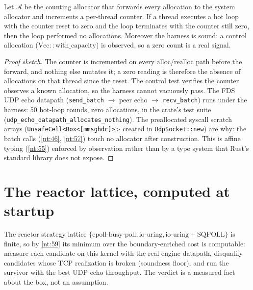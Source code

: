 \begin{theorem}\label{nt:68}
Let $\mathcal{A}$ be the counting allocator that forwards every
allocation to the system allocator and increments a per-thread counter.
If a thread executes a hot loop with the counter reset to zero and the
loop terminates with the counter still zero, then the loop performed no
allocations. Moreover the harness is sound: a control allocation
($\mathrm{Vec::with\_capacity}$) is observed, so a zero count is a real
signal.
\end{theorem}

\begin{proof}[Proof sketch]
The counter is incremented on every $\mathrm{alloc}$/$\mathrm{realloc}$
path before the forward, and nothing else mutates it; a zero reading is
therefore the absence of allocations on that thread since the reset.
The control test verifies the counter observes a known allocation, so
the harness cannot vacuously pass. The FDS UDP echo datapath
(\texttt{send\_batch} $\to$ peer echo $\to$ \texttt{recv\_batch}) runs
under the harness: 50 hot-loop rounds, zero allocations, in the crate's
test suite (\texttt{udp\_echo\_datapath\_allocates\_nothing}). The
preallocated syscall scratch arrays (\texttt{UnsafeCell<Box<[mmsghdr]>}>
created in \texttt{UdpSocket::new}) are why: the batch calls
(\autoref{nt:46}, \ref{nt:57}) touch no allocator after construction.
This is affine typing (\autoref{nt:55}) enforced by observation rather
than by a type system that Rust's standard library does not expose.
\end{proof}

\section{The reactor lattice, computed at startup}\label{sec:autotune}

\begin{theorem}\label{nt:69}
The reactor strategy lattice $\{\text{epoll-busy-poll},
\text{io-uring}, \text{io-uring}+\text{SQPOLL}\}$ is finite, so by
\autoref{nt:59} its minimum over the boundary-enriched cost is
computable: measure each candidate on this kernel with the real engine
datapath, disqualify candidates whose TCP realization is broken
(soundness floor), and run the survivor with the best UDP echo
throughput. The verdict is a measured fact about the box, not an
assumption.
\end{theorem}

